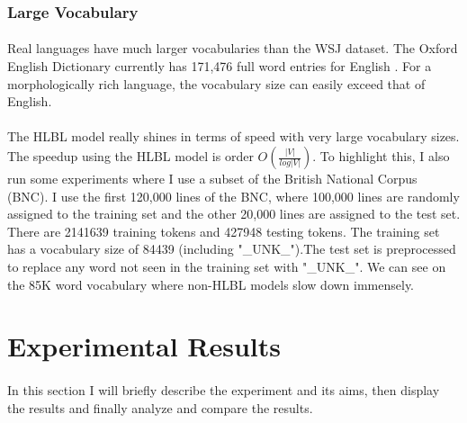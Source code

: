 \subsubsection{Large Vocabulary}
\paragraph{}
Real languages have much larger vocabularies than the WSJ dataset. The Oxford English Dictionary currently has 171,476 full word entries for English \cite{OED}. For a morphologically rich language, the vocabulary size can easily exceed that of English.
\paragraph{}
The HLBL model really shines in terms of speed with very large vocabulary sizes. The speedup using the HLBL model is order $O(\frac{|V|}{log|V|})$. To highlight this, I also run some experiments where I use a subset of the British National Corpus (BNC). I use the first 120,000 lines of the BNC, where 100,000 lines are randomly assigned to the training set and the other 20,000 lines are assigned to the test set. There are 2141639 training tokens and 427948 testing tokens. The training set has a vocabulary size of 84439 (including "\_UNK\_").The test set is preprocessed to replace any word not seen in the training set with "\_UNK\_". We can see on the 85K word vocabulary where non-HLBL models slow down immensely.




\section{Experimental Results}
\paragraph{}
In this section I will briefly describe the experiment and its aims, then display the results and finally analyze and compare the results.

